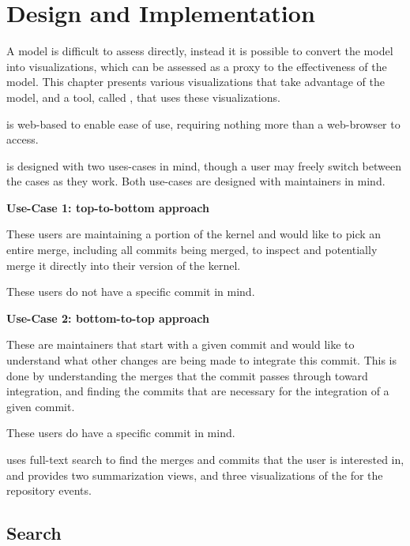 \chapter{Design and Implementation}\label{chap:design_and_implementation}

A model is difficult to assess directly, instead it is possible to
convert the model into visualizations, which can be assessed as a proxy
to the effectiveness of the model. This chapter presents various
visualizations that take advantage of the \mt{} model, and a tool,
called \tool{}, that uses these visualizations.

\tool{} is web-based to enable ease of use, requiring nothing more than
a web-browser to access.

\tool{} is designed with two uses-cases in mind, though a user may
freely switch between the cases as they work. Both use-cases are
designed with maintainers in mind.

\begin{textbox}
  \textbf{Use-Case 1: top-to-bottom approach}

  These users are maintaining a portion of the kernel and would like to
  pick an entire merge, including all commits being merged,
  to inspect and potentially merge it directly into their version of the
  kernel.

  These users do not have a specific commit in mind.
\end{textbox}

\begin{textbox}
  \textbf{Use-Case 2: bottom-to-top approach}

  These are maintainers that start with a given commit and would like to
  understand what other changes are being made to integrate this commit.
  This is done by understanding the merges that the commit passes
  through toward integration, and finding the commits that are necessary
  for the integration of a given commit.

  These users do have a specific commit in mind.
\end{textbox}

\tool{} uses full-text search to find the merges and commits that the
user is interested in, and provides two summarization views,
and three visualizations of the \mt{} for the repository events.

\section{Search}\label{sec:search}

